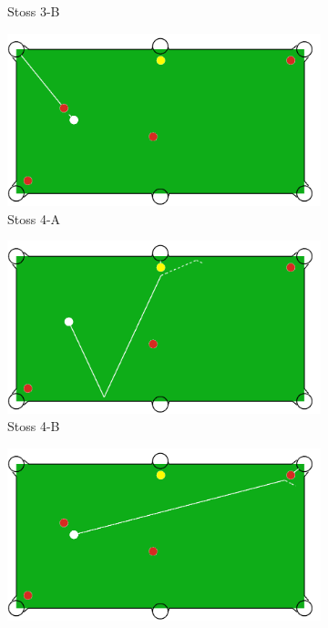\begin{figure}[h!]
\begin{subfigure}[b]{0.4\textwidth}
        \caption{Stoss 3-B}
        \label{fig:situation_2_solution_3b}
    \end{subfigure}
    \hfill
    \begin{subfigure}[b]{0.4\textwidth}
        \centering
        \includegraphics[width=1.0\linewidth]{../common/04_results/resources/simple_search/situation_diverse_solution_deep_search_4a.PNG}
        \caption{Stoss 4-A}
        \label{fig:situation_2_solution_4a}
    \end{subfigure}
    \hfill
    \begin{subfigure}[b]{0.4\textwidth}
        \centering
        \includegraphics[width=1.0\linewidth]{../common/04_results/resources/simple_search/situation_diverse_solution_deep_search_4b.PNG}
        \caption{Stoss 4-B}
        \label{fig:situation_2_solution_4b}
    \end{subfigure}
    \hfill
    \begin{subfigure}[b]{0.4\textwidth}
        \centering
        \includegraphics[width=1.0\linewidth]{../common/04_results/resources/simple_search/situation_diverse_solution_deep_search_5a.PNG}

\end{subfigure}
\end{figure}
